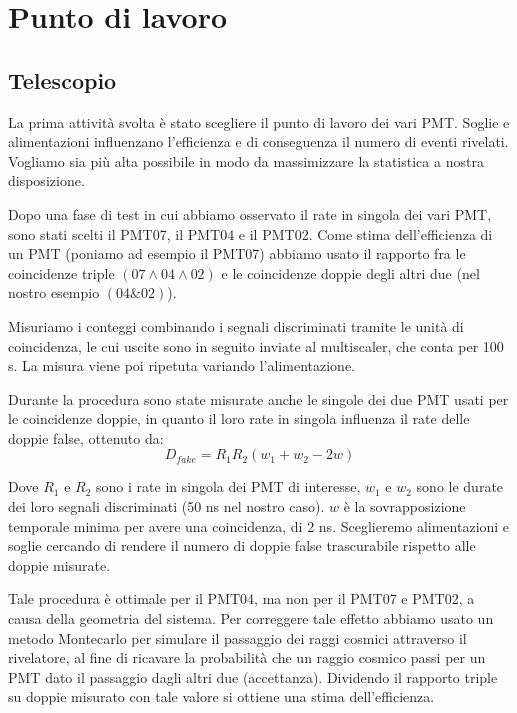 \documentclass[10pt,a4paper]{article}
\begin{document}
\section{Punto di lavoro}

\subsection{Telescopio}
\begin{flushleft}
La prima attività svolta è stato scegliere il punto di lavoro dei vari PMT. Soglie e alimentazioni influenzano l'efficienza e di conseguenza il numero di eventi rivelati. Vogliamo sia più alta possibile in modo da massimizzare la statistica a nostra disposizione. 

Dopo una fase di test in cui abbiamo osservato il rate in singola dei vari PMT, sono stati scelti il PMT07, il PMT04 e il PMT02. Come stima dell'efficienza di un PMT (poniamo ad esempio il PMT07) abbiamo usato il rapporto fra le coincidenze triple $(07\land04\land02)$ e le coincidenze doppie degli altri due (nel nostro esempio $(04\&02)$). 

Misuriamo i conteggi combinando i segnali discriminati tramite le unità di coincidenza, le cui uscite sono in seguito inviate al multiscaler, che conta per 100 s. La misura viene poi ripetuta variando l'alimentazione.

Durante la procedura sono state misurate anche le singole dei due PMT usati per le coincidenze doppie, in quanto il loro rate in singola influenza il rate delle doppie false, ottenuto da:
\begin{equation}
    \label{fake}
    D_{fake} = R_1 R_2 (w_1 + w_2 - 2w)
\end{equation}

Dove $R_1$ e $R_2$ sono i rate in singola dei PMT di interesse, $w_1$ e $w_2$ sono le durate dei loro segnali discriminati (50 ns nel nostro caso). $w$ è la sovrapposizione temporale minima per avere una coincidenza, di 2 ns. Sceglieremo alimentazioni e soglie cercando di rendere il numero di doppie false trascurabile rispetto alle doppie misurate.


Tale procedura è ottimale per il PMT04, ma non per il PMT07 e PMT02, a causa della geometria del sistema. 
Per correggere tale effetto abbiamo usato un metodo Montecarlo per simulare il passaggio dei raggi cosmici attraverso il rivelatore, al fine di ricavare la probabilità che un raggio cosmico passi per un PMT dato il passaggio dagli altri due (accettanza). 
Dividendo il rapporto triple su doppie misurato con tale valore si ottiene una stima dell'efficienza.


\end{flushleft}
\end{document}
